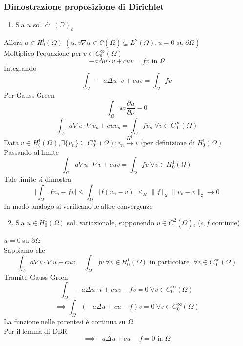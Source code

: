 \subsubsection{Dimostrazione proposizione di Dirichlet}
\begin{enumerate}
	\item Sia $u$ sol. di $(D)_c$

\end{enumerate}
Allora $u\in H_0^1(\Omega)$ $(u,v\nabla u\in C(\overline{\Omega})\subseteq  L^{2}(\Omega),u=0\text{ su }\partial\Omega)$
\\Moltiplico l'equazione per $v\in C_0^\infty(\Omega)$ 
\[-a\Delta u\cdot v+cuv=fv\text{ in }\Omega\]
Integrando
\[\int_{\Omega}^{} -a\Delta u\cdot v+cuv=\int_{\Omega}^{} fv\]
Per Gauss Green
\[\int_{\Omega}^{} av \frac{\partial u}{\partial \nu}=0\]
\[\int_{\Omega}^{} a\nabla u\cdot \nabla v_n+cuv_n=\int_{\Omega}^{} fv_n\ \forall v\in C_0^\infty(\Omega) \]
Data $v\in H_0^1(\Omega),\exists \{v_n\} \subseteq  C_0^\infty(\Omega):v_n\xrightarrow{H^1}v$ (per definizione di $H^1_0(\Omega)$ 
\\Passando al limite
\[\int_{\Omega}^{} a\nabla u\cdot \nabla v+cuv=\int_{\Omega}^{} fv\ \forall v\in H_0^1(\Omega) \]
Tale limite si dimostra
\[\bigg|\int_{\Omega}^{} fv_n-fv\bigg|\le \int_{\Omega}^{} |f(v_n-v)|\le_H \|f\|_2 \|v_n-v\|_2\to 0\]
In modo analogo si verificano le altre convergenze
\begin{enumerate}
	\setcounter{enumi}{1}
	\item Sia $u\in H_0^1(\Omega)$ sol. variazionale, supponendo $u\in C^2(\overline{\Omega})$, ($c,f$ continue)
\end{enumerate}
$u=0$ su $\partial\Omega$ 
\\Sappiamo che
\[\int_{\Omega}^{} a\nabla v\cdot \nabla u+cuv=\int_{\Omega}^{} fv\ \forall v\in H^1_0(\Omega)\text{ in particolare }\ \forall v\in C_0^\infty(\Omega)\]
Tramite Gauss Green
\[\int_{\Omega}^{} -a\Delta u\cdot v+cuv-fv=0\ \forall v\in C_0^\infty(\Omega)\]
\[\implies \int_{\Omega}^{} (-a\Delta u+cu -f)v=0\ \forall v\in C_0^\infty(\Omega)\]
La funzione nelle parentesi è continua su $\overline{\Omega}$
\\Per il lemma di DBR
\[\implies -a\Delta u+cu-f=0\text{ in }\Omega\]

